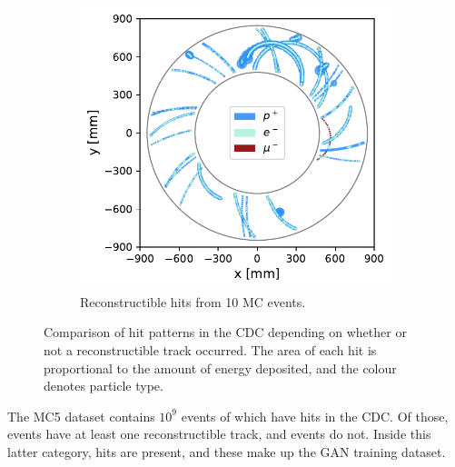 \begin{figure}
\begin{subfigure}[t]{0.45\textwidth}
        \includegraphics[width=\textwidth]{chapter4/only_reconstructible_events.pdf}
        \caption{Reconstructible hits from 10 MC events.}
        \label{fig:cdc_rconst_vs_noise:high}
    \end{subfigure}
    \caption{Comparison of hit patterns in the CDC depending on whether or not a reconstructible track occurred. The area of each hit is proportional to the amount of energy deposited, and the colour denotes particle type.}
    \label{fig:cdc_rconst_vs_noise}
\end{figure}

The MC5 dataset contains $10^{9}$ events of which  have hits in
the CDC. Of those,  events have at least one reconstructible track, and
 events do not. Inside this latter category,  hits are
present, and these make up the GAN training dataset.





